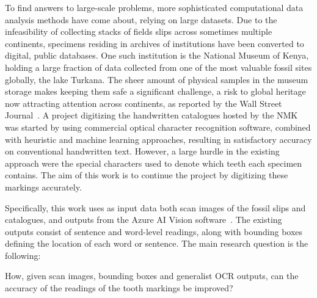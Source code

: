 \documentclass[english,twoside,openright]{UH_DS_MSc}
\begin{document}
To find answers to large-scale problems, more sophisticated computational data analysis methods have come about,
relying on large datasets. Due to the infeasibility of collecting stacks of fields slips across sometimes multiple 
continents, specimens residing in archives of institutions have been converted to digital, public databases.
One such institution is the National Museum of Kenya, holding a large fraction of data collected from one 
of the most valuable fossil sites globally, the lake Turkana. The sheer amount of physical samples in the museum storage
makes keeping them safe a significant challenge, a risk to global heritage now attracting attention across continents,
 as reported by the Wall Street Journal~\cite{hotzMuseumOverflowingPrehistoric2024}.
 A project digitizing the handwritten catalogues hosted by the NMK was started by
using commercial optical character recognition software, combined with heuristic and machine learning approaches, 
resulting in satisfactory accuracy on conventional handwritten text. However, a large hurdle in the existing 
approach were the special characters used to denote which teeth each specimen contains. The aim of this work is 
to continue the project by digitizing these markings accurately.


Specifically, this work uses as input data both scan images of the fossil slips and catalogues, 
and outputs from the Azure AI Vision software~\cite{azurevision}.
The existing outputs consist of sentence and word-level readings, along with bounding boxes defining 
the location of each word or sentence. The main research question is the following: 

How, given scan images, bounding boxes and generalist OCR outputs, can the accuracy of the readings of the tooth markings be improved?
\end{document}
